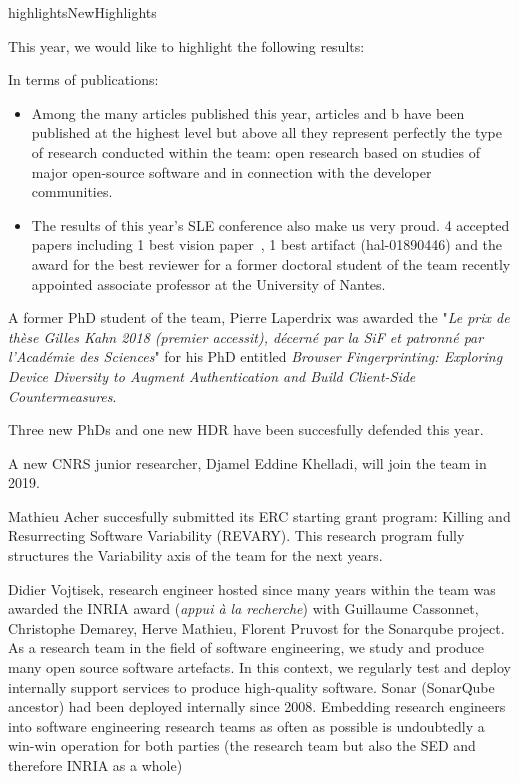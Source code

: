 \documentclass{ra2018}
\begin{document}
\begin{module}{highlights}{NewHighlights}{}

This year, we would like to highlight the following results:

\begin{description}
	\item In terms of publications:
	\begin{itemize}
		\item Among the many articles published this year, articles \cite{halin:hal-01829928} and b \cite{veraperez:hal-01867423} have been published at the highest level but above all they represent perfectly the type of research conducted within the team: open research based on studies of major open-source software and in connection with the developer communities. 
		\item The results of this year's SLE conference also make us very proud. 4 accepted papers including 1 best vision paper~\cite{coulon:hal-01889155}, 1 best artifact (hal-01890446) and the award for the best reviewer for a former doctoral student of the team recently appointed associate professor at the University of Nantes.
	\end{itemize}

	\item A former PhD student of the team, Pierre Laperdrix was awarded the "\textit{Le prix de thèse Gilles Kahn 2018 (premier accessit), décerné par la SiF et patronné par l’Académie des Sciences}" for his PhD entitled \textit{ Browser Fingerprinting: Exploring Device Diversity to Augment Authentication and Build Client-Side Countermeasures}. 
	
	\item Three new PhDs and one new HDR have been succesfully defended this year. 

	\item A new CNRS junior researcher, Djamel Eddine Khelladi, will join the team in 2019.
	
	\item Mathieu Acher succesfully submitted its ERC starting grant program: Killing and Resurrecting Software Variability (REVARY). This research program fully structures the Variability axis of the team for the next years. 
	
	\item Didier Vojtisek, research engineer hosted since many years within the team  was awarded the INRIA award (\textit{appui à la recherche}) with Guillaume Cassonnet, Christophe Demarey, Herve Mathieu, Florent Pruvost for the Sonarqube project. As a research team in the field of software engineering, we study and produce many open source software artefacts. In this context, we regularly test and deploy internally support services to produce high-quality software. Sonar (SonarQube ancestor) had been deployed internally since 2008. Embedding research engineers into software engineering research teams as often as possible is undoubtedly a win-win operation for both parties (the research team but also the SED and therefore INRIA as a whole)
	

\end{description}
\end{module}
\end{document}

